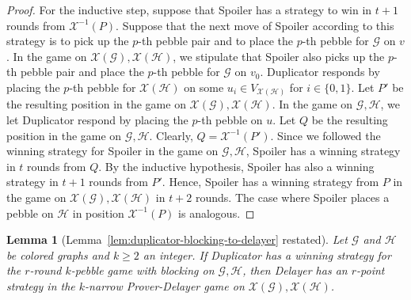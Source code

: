 \documentclass[10pt,a4paper]{article}
\newcommand{\graphG}{\mathcal{G}}
\newcommand{\graphH}{\mathcal{H}}
\newcommand{\graphXG}{\mathcal{X}(\mathcal{G})}
\newcommand{\graphXH}{\mathcal{X}(\mathcal{H})}
\newcommand{\vertexXH}{V_{\graphXH}}
\newcommand{\X}{\mathcal{X}}
\newcommand{\XI}{\X^{-1}}
\newtheorem{lemma}[theorem]{Lemma}
\begin{document}
\begin{proof}
For the inductive step, suppose that Spoiler has a strategy to win in $t+1$ rounds from $\XI(P)$. Suppose that the next move of Spoiler according to this strategy is to pick up the $p$-th pebble pair and to place the $p$-th pebble for  $\graphG$ on $v$.
In the game on $\graphXG, \graphXH$, we stipulate that Spoiler also picks up the $p$-th pebble pair and place the $p$-th pebble for $\graphG$ on $v_0$. Duplicator responds by placing the $p$-th pebble for $\graphXH$ on some $u_i \in \vertexXH$ for $i \in \{0,1\}$.
Let $P'$ be the resulting position in the game on $\graphXG, \graphXH$.
In the game on $\graphG,\graphH$, we let Duplicator respond by
placing the $p$-th pebble on $u$. Let $Q$ be the resulting position in the game on  $\graphG,\graphH$.
Clearly, $Q = \XI(P')$.
Since we followed the winning strategy for Spoiler in the game on $\graphG,\graphH$,
Spoiler has a winning strategy in $t$ rounds from $Q$.
By the inductive hypothesis, Spoiler has also a winning strategy in $t+1$ rounds from $P'$.
Hence, Spoiler has a winning strategy from $P$ in the game on $\graphXG, \graphXH$ in $t+2$ rounds.
The case where Spoiler places a pebble on $\graphH$ in position $\XI(P)$ is analogous. 
\end{proof} 

\begin{lemma}[Lemma~\ref{lem:duplicator-blocking-to-delayer} restated]
        Let $\graphG$ and $\graphH$ be colored graphs
        and $k\geq 2$ an integer. If Duplicator has a winning strategy for the $r$-round $k$-pebble game with blocking on $\graphG, \graphH$, then Delayer has an $r$-point strategy in the $k$-narrow Prover-Delayer game on $\graphXG, \graphXH$.
\end{lemma}
\end{document}
